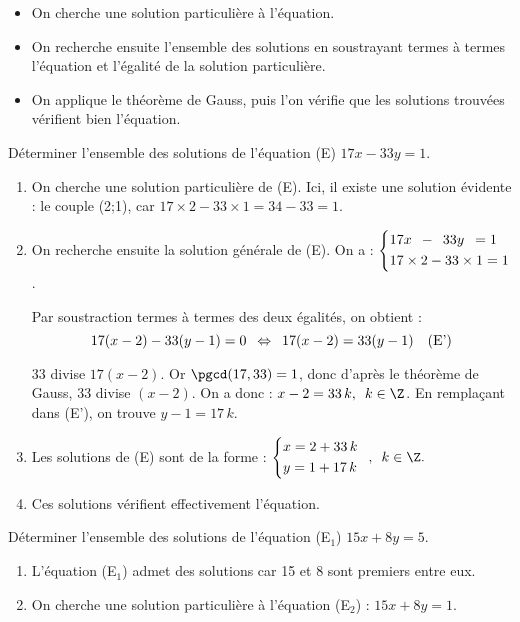 \begin{methode*1}[Résoudre une équation du type \textit{ax} + \textit{by} = \textit{c}\MethodeRefExercice*{exo-eq_diophantienne}]
\begin{itemize}
\item On cherche une solution particulière à l'équation.

\item On recherche ensuite l'ensemble des solutions en soustrayant termes à termes l'équation et l'égalité de la solution particulière.

\item On applique le théorème de Gauss, puis l'on vérifie que les solutions trouvées vérifient bien l'équation.
\end{itemize}
\exercice
\label{methode-eq_diophantienne}
Déterminer l'ensemble des solutions de l'équation (E) \enskip $17x-33y=1$.
\correction
\begin{enumerate}
\item On cherche une solution particulière de (E). Ici, il existe une
  solution évidente : le couple (2;1), car \enskip $17\times2-33\times1=34-33=1$.\medskip
\item On recherche ensuite la solution générale de (E).
On a : \enskip $\left\{\begin{aligned}
&17x\enskip -\enskip 33y\enskip=1\\
&17\times 2 - 33 \times 1 = 1\end{aligned}\right.$.

Par soustraction termes à termes des deux égalités, on obtient :
$$17(x-2)-33(y-1)=0\enskip\Leftrightarrow\enskip 17(x-2)=33(y-1)\quad (\text{E'})$$

33 divise $17(x-2)$. Or $\pgcd(17,33)=1$, donc d'après le théorème de
Gauss, 33 divise $(x-2)$. On a donc : \enskip
$x-2=33\,k,\enskip k\in\Z$. En remplaçant dans (E'), on trouve \enskip
$y-1=17\,k$.\medskip

\item Les  solutions de (E) sont de la forme : \enskip $\left\{\begin{aligned}
&x=2+33\,k\\
&y=1+17\,k\end{aligned}\right.\enskip, \enskip k\in\Z.$\medskip

\item Ces solutions vérifient effectivement l’équation.
\end{enumerate}
\exercice
Déterminer l'ensemble des solutions de l'équation (E$_1$) \enskip $15x+8y=5$.
\correction
\begin{enumerate}
\item L'équation (E$_1$) admet des solutions car 15 et 8 sont premiers entre eux.
\item On cherche une solution particulière à l'équation (E$_2$) : \enskip $15x+8y=1$.


\end{enumerate}
\end{methode*1}
